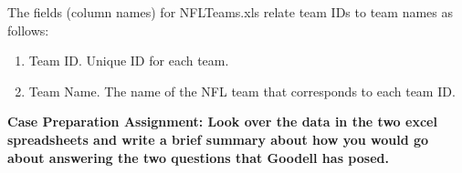 \documentclass{article}    %
\begin{document}
\medskip
  
\noindent The fields (column names) for NFLTeams.xls relate team IDs to team names as follows:
\begin{enumerate}
\item Team ID. Unique ID for each team.
\item Team Name.  The name of the NFL team that corresponds to each team ID.
\end{enumerate}

\textbf{Case Preparation Assignment: Look over the data in the two excel spreadsheets and write a brief summary about how you would go about answering the two questions that Goodell has posed.}

%
%
\end{document}

